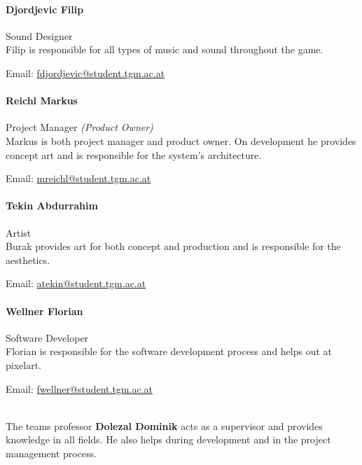 \documentclass[11pt]{article}
\begin{document}
\paragraph{Djordjevic Filip} Sound Designer\\
Filip is responsible for all types of music and sound throughout the game.
\begin{description}
 \item Email: \href{mailto:fdjordjevic@student.tgm.ac.at}{fdjordjevic@student.tgm.ac.at}
\end{description}
\paragraph{Reichl Markus} Project Manager \textit{\small{(Product Owner)}}\\
Markus is both project manager and product owner. On development he provides concept art and is responsible for the system's architecture.
\begin{description}
 \item Email: \href{mailto:mreichl@student.tgm.ac.at}{mreichl@student.tgm.ac.at}
\end{description}
\paragraph{Tekin Abdurrahim} Artist\\
Burak provides art for both concept and production and is responsible for the aesthetics.
\begin{description}
 \item Email: \href{mailto:atekin@student.tgm.ac.at}{atekin@student.tgm.ac.at}
\end{description}
\paragraph{Wellner Florian} Software Developer\\
Florian is responsible for the software development process and helps out at pixelart.
\begin{description}
 \item Email: \href{mailto:fwellner@student.tgm.ac.at}{fwellner@student.tgm.ac.at}
\end{description}
~\\
The teams professor \textbf{Dolezal Dominik} acts as a supervisor and provides knowledge in all fields.
He also helps during development and in the project management process.
\end{document}
